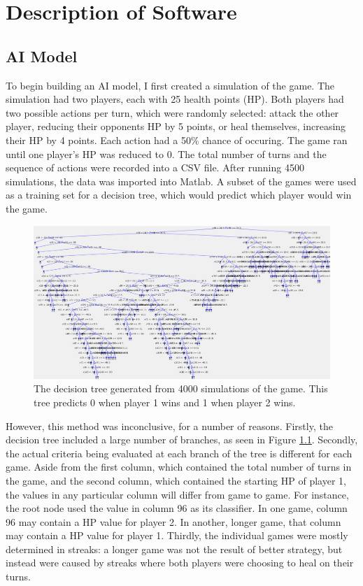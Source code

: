\chapter{Description of Software}
\section{AI Model}
To begin building an AI model, I first created a simulation of the game. The simulation had two players, each with 25 health points (HP). Both players had two possible actions per turn, which were randomly selected: attack the other player, reducing their opponents HP by 5 points, or heal themselves, increasing their HP by 4 points. Each action had a 50\% chance of occuring. The game ran until one player's HP was reduced to 0. The total number of turns and the sequence of actions were recorded into a CSV file. After running 4500 simulations, the data was imported into Matlab. A subset of the games were used as a training set for a decision tree, which would predict which player would win the game.\\

\begin{figure}[H]
  \centering
  \includegraphics[width=12cm]{figures/firstDecisionTree.png}
  \caption{The decision tree generated from 4000 simulations of the game. This tree predicts 0 when player 1 wins and 1 when player 2 wins.}
  \label{fig:decisionTree1}
\end{figure}

However, this method was inconclusive, for a number of reasons. Firstly, the decision tree included a large number of branches, as seen in Figure \ref{fig:decisionTree1}. Secondly, the actual criteria being evaluated at each branch of the tree is different for each game. Aside from the first column, which contained the total number of turns in the game, and the second column, which contained the starting HP of player 1, the values in any particular column will differ from game to game. For instance, the root node used the value in column 96 as its classifier. In one game, column 96 may contain a HP value for player 2. In another, longer game, that column may contain a HP value for player 1. Thirdly, the individual games were mostly determined in streaks: a longer game was not the result of better strategy, but instead were caused by streaks where both players were choosing to heal on their turns.

